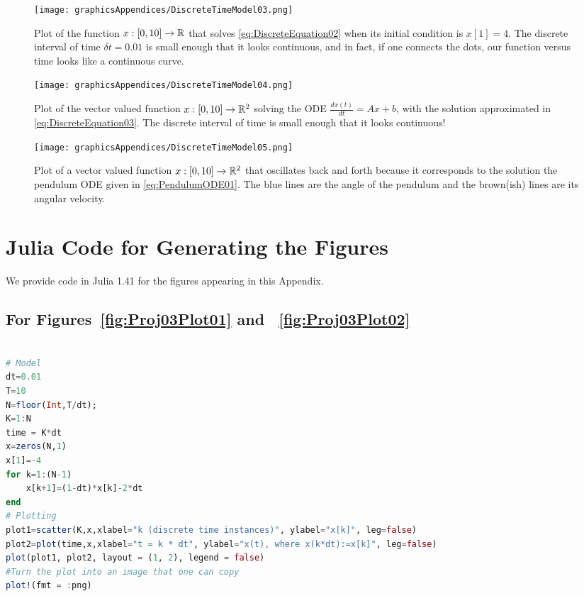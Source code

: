 \begin{figure}[t!]
\centering
\texttt{[image: graphicsAppendices/DiscreteTimeModel03.png]}
\caption[]{Plot of the function $x:[0,10]\to \mathbb R$ that solves \eqref{eq:DiscreteEquation02} when its initial condition is $x[1]=4$. The discrete interval of time $\delta t = 0.01$ is small enough that it looks continuous, and in fact, if one connects the dots, our function versus time looks like a continuous curve.}
\label{fig:Proj03Plot03B}
\end{figure}



\begin{figure}[hbt!]
\centering
\texttt{[image: graphicsAppendices/DiscreteTimeModel04.png]}
\caption[]{Plot of the vector valued function $x:[0,10]\to \mathbb R^2$ solving the ODE $\frac{dx(t)}{dt }= Ax +b$, with the solution approximated in  \eqref{eq:DiscreteEquation03}. The discrete interval of time is small enough that it looks continuous!}
\label{fig:Proj03Plot04}
\end{figure}

\begin{figure}[hbt!]
\centering
\texttt{[image: graphicsAppendices/DiscreteTimeModel05.png]}
\caption[]{Plot of a vector valued function $x:[0,10]\to \mathbb R^2$  that oscillates back and forth because it corresponds to the solution the pendulum ODE given in \eqref{eq:PendulumODE01}. The blue lines are the angle of the pendulum and the brown(ish) lines are its angular velocity.}
\label{fig:Proj03Plot05}
\end{figure}

\clearpage


\section{Julia Code for Generating the Figures}

We provide code in Julia 1.41 for the figures appearing in this Appendix.

\subsection{For Figures~\ref{fig:Proj03Plot01} and ~\ref{fig:Proj03Plot02}}
\label{sec:CodeFigs0102}

\begin{lstlisting}[language=Julia]

# Model 
dt=0.01
T=10
N=floor(Int,T/dt);
K=1:N
time = K*dt
x=zeros(N,1)
x[1]=-4
for k=1:(N-1)
    x[k+1]=(1-dt)*x[k]-2*dt
end
# Plotting 
plot1=scatter(K,x,xlabel="k (discrete time instances)", ylabel="x[k]", leg=false)
plot2=plot(time,x,xlabel="t = k * dt", ylabel="x(t), where x(k*dt):=x[k]", leg=false)
plot(plot1, plot2, layout = (1, 2), legend = false)
#Turn the plot into an image that one can copy
plot!(fmt = :png) 

\end{lstlisting}

